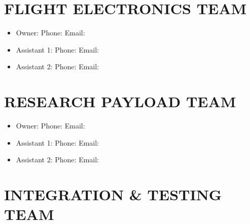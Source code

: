\documentclass[11pt,letterpaper]{article}
\begin{document}
{\section{FLIGHT ELECTRONICS TEAM}

\begin{itemize}
  \item Owner: \underline{\hspace{4.95cm}}  Phone: \underline{\hspace{1.95cm}}  Email: \underline{\hspace{2.4cm}}
  \item Assistant 1: \underline{\hspace{4.05cm}}  Phone: \underline{\hspace{1.95cm}}  Email: \underline{\hspace{2.4cm}}
  \item Assistant 2: \underline{\hspace{4.05cm}}  Phone: \underline{\hspace{1.95cm}}  Email: \underline{\hspace{2.4cm}}
\end{itemize}

\section{RESEARCH PAYLOAD TEAM}

\begin{itemize}
  \item Owner: \underline{\hspace{4.95cm}}  Phone: \underline{\hspace{1.95cm}}  Email: \underline{\hspace{2.4cm}}
  \item Assistant 1: \underline{\hspace{4.05cm}}  Phone: \underline{\hspace{1.95cm}}  Email: \underline{\hspace{2.4cm}}
  \item Assistant 2: \underline{\hspace{4.05cm}}  Phone: \underline{\hspace{1.95cm}}  Email: \underline{\hspace{2.4cm}}
\end{itemize}

\section{INTEGRATION \& TESTING TEAM}

}
\end{document}

